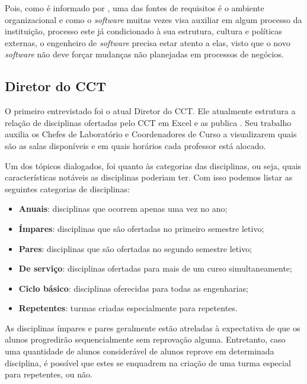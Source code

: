 Pois, como é informado por , uma das fontes de requisitos é o ambiente organizacional e como o \textit{software} muitas vezes visa auxiliar em algum processo da instituição, processo este já condicionado à sua estrutura, cultura e políticas externas, o engenheiro de \textit{software} precisa estar atento a elas, visto que o novo \textit{software} não deve forçar mudanças não planejadas em processos de negócios.


\subsection{Diretor do CCT} \label{subsec:3_Diretor} %

O primeiro entrevistado foi o atual Diretor do CCT. Ele atualmente estrutura a relação de disciplinas ofertadas pelo CCT em Excel e as publica . Seu trabalho auxilia os Chefes de Laboratório e Coordenadores de Curso a visualizarem quais são as salas disponíveis e em quais horários cada professor está alocado.

Um dos tópicos dialogados, foi quanto às categorias das disciplinas, ou seja, quais características notáveis as disciplinas poderiam ter. Com isso podemos listar as seguintes categorias de disciplinas:

\begin{itemize}
  \item \textbf{Anuais}: disciplinas que ocorrem apenas uma vez no ano;
  \item \textbf{Ímpares}: disciplinas que são ofertadas no primeiro semestre letivo;
  \item \textbf{Pares}: disciplinas que são ofertadas no segundo semestre letivo;
  \item \textbf{De serviço}: disciplinas ofertadas para mais de um curso simultaneamente;
  \item \textbf{Ciclo básico}: disciplinas oferecidas para todas as engenharias;
  \item \textbf{Repetentes}: turmas criadas especialmente para repetentes.
\end{itemize}

As disciplinas ímpares e pares geralmente estão atreladas à expectativa de que os alunos progredirão sequencialmente sem reprovação alguma. Entretanto, caso uma quantidade de alunos considerável de alunos reprove em determinada disciplina, é possível que estes se enquadrem na criação de uma turma especial para repetentes, ou não.

